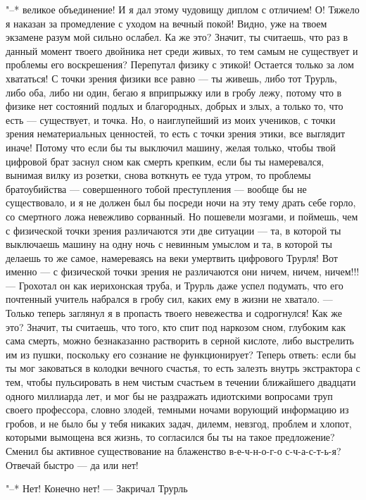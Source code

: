 "--* великое объединение! И я дал этому чудовищу диплом с
отличием! О! Тяжело я наказан за промедление с уходом на
вечный покой! Видно, уже на твоем экзамене разум мой сильно
ослабел. Ка же это? Значит, ты считаешь, что раз в данный
момент твоего двойника нет среди живых, то тем самым не
существует и проблемы его воскрешения? Перепутал физику с
этикой! Остается только за лом хвататься! С точки зрения
физики все равно --- ты живешь, либо тот Трурль, либо оба,
либо ни один, бегаю я вприпрыжку или в гробу лежу, потому
что в физике нет состояний подлых и благородных, добрых и
злых, а только то, что есть --- существует, и точка. Но, о
наиглупейший из моих учеников, с точки зрения нематериальных
ценностей, то есть с точки зрения этики, все выглядит иначе!
Потому что если бы ты выключил машину, желая только, чтобы
твой цифровой брат заснул сном как смерть крепким, если бы
ты намеревался, вынимая вилку из розетки, снова воткнуть ее
туда утром, то проблемы братоубийства --- совершенного тобой
преступления --- вообще бы не существовало, и я не должен был
бы посреди ночи на эту тему драть себе горло, со смертного
ложа невежливо сорванный. Но пошевели мозгами, и поймешь,
чем с физической точки зрения различаются эти две ситуации --- та,
в которой ты выключаешь машину на одну ночь с невинным
умыслом и та, в которой ты делаешь то же самое, намереваясь
на веки умертвить цифрового Трурля! Вот именно --- с
физической точки зрения не различаются они ничем, ничем,
ничем!!! --- Грохотал он как иерихонская труба, и Трурль даже
успел подумать, что его почтенный учитель набрался в гробу
сил, каких ему в жизни не хватало. --- Только теперь заглянул
я в пропасть твоего невежества и содрогнулся! Как же это?
Значит, ты считаешь, что того, кто спит под наркозом сном,
глубоким как сама смерть, можно безнаказанно растворить в
серной кислоте, либо выстрелить им из пушки, поскольку его
сознание не функционирует? Теперь ответь: если бы ты мог
заковаться в колодки вечного счастья, то есть залезть внутрь
экстрактора с тем, чтобы пульсировать в нем чистым счастьем
в течении ближайшего двадцати одного миллиарда лет, и мог бы
не раздражать идиотскими вопросами труп своего профессора,
словно злодей, темными ночами ворующий информацию из гробов,
и не было бы у тебя никаких задач, дилемм, невзгод, проблем
и хлопот, которыми вымощена вся жизнь, то согласился бы ты
на такое предложение? Сменил бы активное существование на
блаженство в-е-ч-н-о-г-о с-ч-а-с-т-ь-я? Отвечай быстро --- да
или нет!

"--* Нет! Конечно нет! --- Закричал Трурль

